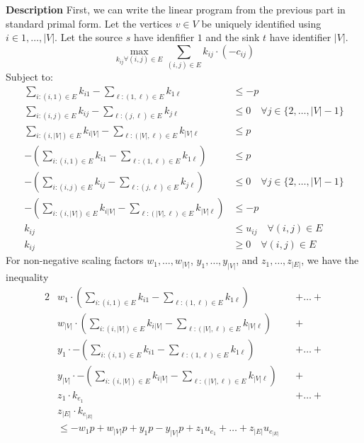 \documentclass[12pt,twoside]{article}
\begin{document}
\begin{problems}
\begin{problemparts}
{\bf Description} First, we can write the linear program from the previous
part in standard primal form. Let the vertices $v \in V$ be uniquely
identified using $i \in {1, \ldots, |V|}$. Let the source $s$ have
idenfifier $1$ and the sink $t$ have identifier $|V|$.
$$ \max_{k_{ij} \forall (i, j) \in E} \sum_{(i, j) \in E} k_{ij} \cdot
\left(- c_{ij}\right) $$
Subject to:
\begin{align*}
  \sum_{i:(i, 1) \in E} k_{i1} - \sum_{\ell:(1, \ell) \in E} k_{1\ell} &\leq
    -p \\
  \sum_{i:(i, j) \in E} k_{ij} - \sum_{\ell:(j, \ell) \in E} k_{j\ell} &\leq
    0 \quad \forall j \in \{2, \ldots, |V| - 1\} \\
  \sum_{i:(i, |V|) \in E} k_{i|V|} - \sum_{\ell:(|V|, \ell) \in E}
    k_{|V|\ell} &\leq p \\
  -\left(\sum_{i:(i, 1) \in E} k_{i1} - \sum_{\ell:(1, \ell) \in E}
    k_{1\ell}\right) &\leq p \\
  -\left(\sum_{i:(i, j) \in E} k_{ij} - \sum_{\ell:(j, \ell) \in E}
    k_{j\ell}\right) &\leq 0 \quad \forall j \in \{2, \ldots, |V| - 1\} \\
  -\left(\sum_{i:(i, |V|) \in E} k_{i|V|} - \sum_{\ell:(|V|, \ell) \in E}
    k_{|V|\ell}\right) &\leq -p \\
  k_{ij} &\leq u_{ij}\quad \forall (i, j) \in E \\
  k_{ij} &\geq 0\quad \forall (i, j) \in E
\end{align*}
For non-negative scaling factors $w_1, \ldots, w_{|V|}$, $y_1, \ldots,
y_{|V|}$, and $z_1, \ldots, z_{|E|}$, we have the inequality
\begin{alignat*}{2}
  &w_1 \cdot \left(\sum_{i:(i, 1) \in E} k_{i1} - \sum_{\ell:(1, \ell) \in E}
    k_{1\ell}\right) &&+ \ldots +\\
  &w_{|V|} \cdot \left(\sum_{i:(i, |V|) \in E} k_{i|V|} - \sum_{\ell:(|V|,
    \ell) \in E} k_{|V|\ell}\right) &&+ \\
  &y_{1} \cdot -\left(\sum_{i:(i, 1) \in E} k_{i1} - \sum_{\ell:(1,
    \ell) \in E} k_{1\ell}\right) &&+ \ldots + \\
  &y_{|V|} \cdot -\left(\sum_{i:(i, |V|) \in E} k_{i|V|} - \sum_{\ell:(|V|,
    \ell) \in E} k_{|V|\ell}\right) &&+ \\
  &z_{1} \cdot k_{e_{1}} &&+ \ldots + \\
  &z_{|E|} \cdot k_{e_{|E|}} \\
  & \leq -w_1 p + w_{|V|} p + y_{1} p - y_{|V|} p + z_{1} u_{e_{1}} + \ldots
    + z_{|E|} u_{e_{|E|}}
\end{alignat*}

\end{problemparts}
\end{problems}
\end{document}

